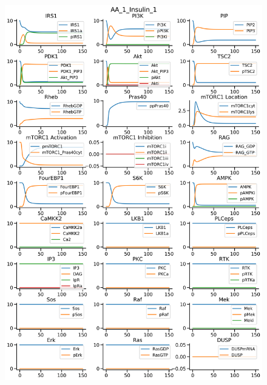 \documentclass{beamer}
\begin{document}
\begin{frame}
\begin{figure}
\begin{minipage}{0.45\textwidth}
        \includegraphics[width=\textwidth]{../simulations/ExtendedPI3KModel/validations/AAWithInsulin/AA_1_Insulin_1-3.png}
    \end{minipage}
\end{figure}
\end{frame}


\end{document}
